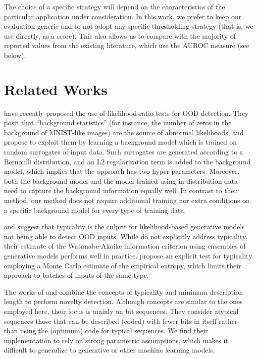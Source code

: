 \documentclass[letterpaper]{article} \usepackage{iclr2020_conference,times}
\begin{document}
The choice of a specific strategy will depend on the characteristics of the particular application under consideration. In this work, we prefer to keep our evaluation generic and to not adopt any specific thresholding strategy (that is, we use  directly, as a score). This also allows us to compare with the majority of reported values from the existing literature, which use the AUROC measure (see below).



\section{Related Works}
\label{sec:related}

\citet{Ren19NeurIPS} have recently proposed the use of likelihood-ratio tests for OOD detection.
They posit that ``background statistics'' (for instance, the number of zeros in the background of MNIST-like images) are the source of abnormal likelihoods, and propose to exploit them by learning a background model which is trained on random surrogates of input data.
Such surrogates are generated according to a Bernoulli distribution, and an L2 regularization term is added to the background model, which implies that the approach has two hyper-parameters. 
Moreover, both the background model and the model trained using in-distribution data need to capture the background information equally well.
In contrast to their method, our method does not require additional training nor extra conditions on a specific background model for every type of training data.

\citet{Choi18ARXIV} and \citet{Nalisnick19ARXIV} suggest that typicality is the culprit for likelihood-based generative models not being able to detect OOD inputs. While \citet{Choi18ARXIV} do not explicitly address typicality, their estimate of the Watanabe-Akaike information criterion using ensembles of generative models performs well in practice. \citet{Nalisnick19ARXIV} propose an explicit test for typicality employing a Monte Carlo estimate of the empirical entropy, which limits their approach to batches of inputs of the same type. 

The works of \citet{HostMadsen19TIT} and \citet{Sabeti19ENTROPY} combine the concepts of typicality and minimum description length to perform novelty detection. Although concepts are similar to the ones employed here, their focus is mainly on bit sequences. They consider atypical sequences those that can be described (coded) with fewer bits in itself rather than using the (optimum) code for typical sequences. We find their implementation to rely on strong parametric assumptions, which makes it difficult to generalize to generative or other machine learning models.
\end{document}
